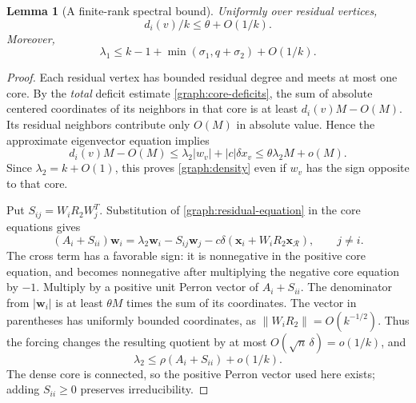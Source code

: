 \documentclass[11pt,a4paper]{article}
\numberwithin{equation}{section}
\newtheorem{lemma}[theorem]{Lemma}
\theoremstyle{definition}
\theoremstyle{remark}
\newcommand{\norm}[1]{\left\lVert#1\right\rVert}
\begin{document}
\begin{lemma}[A finite-rank spectral bound]\label{graph:pole}
Uniformly over residual vertices,
\begin{equation}\label{graph:density}
 d_i(v)/k\le\theta+O(1/k).
\end{equation}
Moreover,
\begin{equation}\label{graph:pole-bound}
 \lambda_1\le k-1+\min(\sigma_1,q+\sigma_2)+O(1/k).
\end{equation}
\end{lemma}
\begin{proof}
Each residual vertex has bounded residual degree and meets at most one
core. By the \emph{total} deficit estimate \eqref{graph:core-deficits},
the sum of absolute centered coordinates of its neighbors in that core
is at least $d_i(v)M-O(M)$. Its residual neighbors contribute only
$O(M)$ in absolute value. Hence the approximate eigenvector equation
implies
\[
 d_i(v)M-O(M)\le\lambda_2|w_v|+|c|\delta x_v
 \le\theta\lambda_2M+o(M).
\]
Since $\lambda_2=k+O(1)$, this proves \eqref{graph:density} even if
$w_v$ has the sign opposite to that core.

Put $S_{ij}=W_iR_2W_j^T$. Substitution of
\eqref{graph:residual-equation} in the core equations gives
\begin{equation}\label{graph:core-equation}
 (A_i+S_{ii})\mathbf w_i
 =\lambda_2\mathbf w_i-S_{ij}\mathbf w_j
 -c\delta(\mathbf x_i+W_iR_2\mathbf x_{\mathcal R}),\qquad j\ne i.
\end{equation}
The cross term has a favorable sign: it is nonnegative in the positive
core equation, and becomes nonnegative after multiplying the negative
core equation by $-1$. Multiply by a positive unit Perron vector of
$A_i+S_{ii}$. The denominator from $|\mathbf w_i|$ is at least
$\theta M$ times the sum of its coordinates. The vector in parentheses
has uniformly bounded coordinates, as
$\norm{W_iR_2}=O(k^{-1/2})$. Thus the forcing changes the resulting
quotient by at most $O(\sqrt n\,\delta)=o(1/k)$, and
\begin{equation}\label{graph:core-radius}
 \lambda_2\le\rho(A_i+S_{ii})+o(1/k).
\end{equation}
The dense core is connected, so the positive Perron vector used here
exists; adding $S_{ii}\ge0$ preserves irreducibility.


\end{proof}
\end{document}
